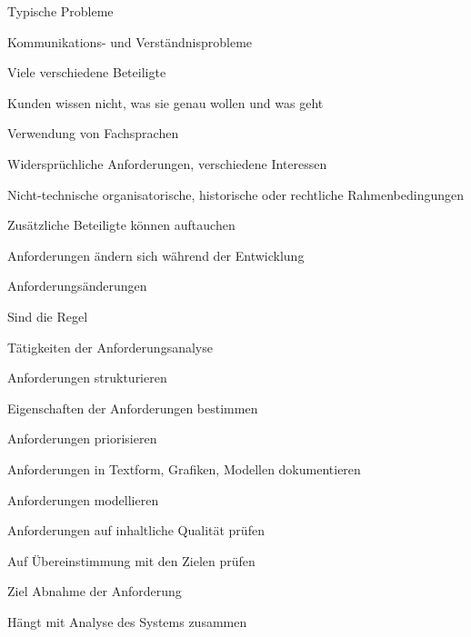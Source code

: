 \documentclass[a4paper]{article}
\begin{document}
\begin{multicols}{3}
  \begin{itemize*}
    \item Typische Probleme
          \begin{itemize*}
            \item Kommunikations- und Verständnisprobleme
            \item Viele verschiedene Beteiligte
            \item Kunden wissen nicht, was sie genau wollen und was geht
            \item Verwendung von Fachsprachen
            \item Widersprüchliche Anforderungen, verschiedene Interessen
            \item Nicht-technische organisatorische, historische oder rechtliche Rahmenbedingungen
            \item Zusätzliche Beteiligte können auftauchen
            \item Anforderungen ändern sich während der Entwicklung
          \end{itemize*}
    \item Anforderungsänderungen
          \begin{itemize*}
            \item Sind die Regel
          \end{itemize*}
    \item Tätigkeiten der Anforderungsanalyse
          \begin{itemize*}
            \item Anforderungen strukturieren
            \item Eigenschaften der Anforderungen bestimmen
            \item Anforderungen priorisieren
            \item Anforderungen in Textform, Grafiken, Modellen dokumentieren
            \item Anforderungen modellieren
            \item Anforderungen auf inhaltliche Qualität prüfen
            \item Auf Übereinstimmung mit den Zielen prüfen
                  \begin{itemize*}
                    \item Ziel Abnahme der Anforderung
                  \end{itemize*}
            \item Hängt mit Analyse des Systems zusammen
          \end{itemize*}

\end{itemize*}
\end{multicols}
\end{document}
